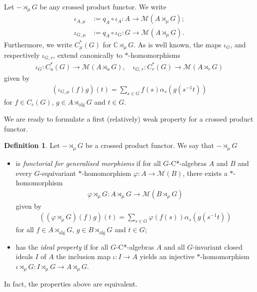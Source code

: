 \documentclass[12pt]{amsart}
\theoremstyle{definition}
\newtheorem{defn}[thm]{Definition}
\theoremstyle{remark}
\numberwithin{equation}{section}
\begin{document}
Let $-\rtimes_\mu G$ be any crossed product functor. We write
\begin{align*}
	\iota_{A,\mu} &:= q_A \circ \iota_A \colon A \to \mathcal{M}(A\rtimes_\mu G);\\
	\iota_{G,\mu} &:= q_A \circ \iota_G \colon G\to \mathcal{M}(A\rtimes_\mu G).
\end{align*}
Furthermore, we write $C^*_\mu(G)$ for $\mathbb{C}\rtimes_\mu G$.
As is well known, the maps $\iota_{G}$, and respectively $\iota_{G,r}$, extend canonically to $*$-homomorphisms
\begin{align*}
	\iota_{G}\colon C^*_u(G) \to \mathcal{M}(A\rtimes_u G), \quad
	\iota_{G,r} \colon C^*_r(G) \to \mathcal{M}(A\rtimes_r G)
\end{align*}
given by
\begin{align*}
	(\iota_{G,\mu}(f) g)(t) = \sum_{s \in G} f(s)\alpha_s(g(s^{-1}t))
\end{align*}
for $f\in C_c(G)$, $g\in A\rtimes_{\mathrm{alg}}G$ and $t\in G$.


We are ready to formulate a first (relatively) weak property
for a crossed product functor.
\begin{defn}
	Let $-\rtimes_\mu G$ be a crossed product functor. We say that $-\rtimes_\mu G$
	\begin{itemize}
		\item[(i)] is \emph{functorial for generalised morphisms}
		if  for all $G$-C*-algebras $A$ and $B$ and every $G$-equivariant $*$-homomorphism
		$\varphi\colon A\to \mathcal{M}(B)$, there exists a $*$-homomorphism
		\begin{align*}
			\varphi\rtimes_\mu G \colon A\rtimes_\mu G \to \mathcal{M}(B\rtimes_\mu G)
		\end{align*}
		given by
		\begin{align*}
			((\varphi\rtimes_\mu G )(f) g )(t) =
			\sum_{s \in G} \varphi(f(s))\alpha_s(g(s^{-1}t))
		\end{align*}
		for all $f\in A\rtimes_{\mathrm{alg}}G $, $g\in B\rtimes_{\mathrm{alg}}G$ and
		$t\in G$;
		\item[(ii)] has the \emph{ideal property} if for all
		$G$-C*-algebras $A$ and all $G$-invariant closed ideals $I$ of $A$ the inclusion map
		$\iota\colon I \to A$ yields an injective $*$-homomorphism
		$\iota\rtimes_\mu G\colon I\rtimes_\mu G \to A\rtimes_\mu G$.
	\end{itemize}
\end{defn}

In fact, the properties above are equivalent.
\end{document}
